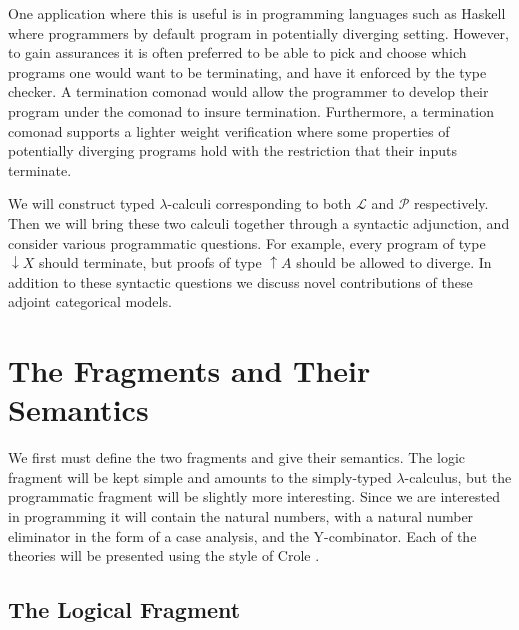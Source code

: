 \documentclass{article}
\newcommand{\cat}[1]{\mathcal{#1}}
\newcommand{\uar}[0]{\mathop{\uparrow}}
\newcommand{\dar}[0]{\mathop{\downarrow}}
\begin{document}
One application where this is useful is in programming languages such
as Haskell where programmers by default program in potentially
diverging setting.  However, to gain assurances it is often preferred
to be able to pick and choose which programs one would want to be
terminating, and have it enforced by the type checker.  A termination
comonad would allow the programmer to develop their program under the
comonad to insure termination.  Furthermore, a termination comonad
supports a lighter weight verification where some properties of
potentially diverging programs hold with the restriction that their
inputs terminate.  

We will construct typed $\lambda$-calculi corresponding to both
$\cat{L}$ and $\cat{P}$ respectively.  Then we will bring these two
calculi together through a syntactic adjunction, and consider various
programmatic questions.  For example, every program of type $\dar X$
should terminate, but proofs of type $\uar A$ should be allowed to
diverge.  In addition to these syntactic questions we discuss novel
contributions of these adjoint categorical models.

\section{The Fragments and Their Semantics}
\label{sec:the_fragments_and_their_semantics}

We first must define the two fragments and give their semantics.  The
logic fragment will be kept simple and amounts to the simply-typed
$\lambda$-calculus, but the programmatic fragment will be slightly
more interesting.  Since we are interested in programming it will
contain the natural numbers, with a natural number eliminator in the
form of a case analysis, and the Y-combinator.  Each of the theories
will be presented using the style of Crole \cite{??}.

\subsection{The Logical Fragment}
\label{subsec:the_logical_fragment}
\end{document}
